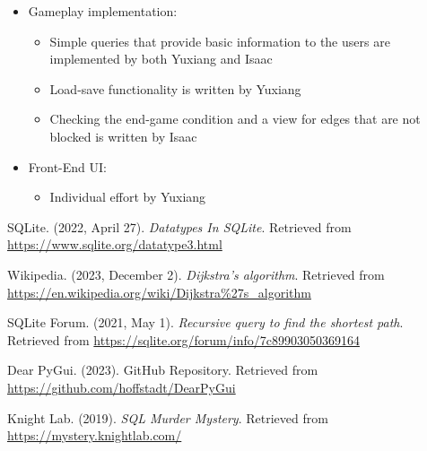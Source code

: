 \documentclass{article}
\begin{document}
\begin{itemize}
    \item Gameplay implementation:
    \begin{itemize}
        \item Simple queries that provide basic information to the users are implemented by both Yuxiang and Isaac
        \item Load-save functionality is written by Yuxiang
        \item Checking the end-game condition and a view for edges that are not blocked is written by Isaac
    \end{itemize}
    \item Front-End UI:
    \begin{itemize}
        \item Individual effort by Yuxiang
    \end{itemize}
\end{itemize}

\pagebreak

\begin{thebibliography}{9}
    SQLite. (2022, April 27). \textit{Datatypes In SQLite}. Retrieved from \url{https://www.sqlite.org/datatype3.html}

    Wikipedia. (2023, December 2). \textit{Dijkstra's algorithm}. Retrieved from \url{https://en.wikipedia.org/wiki/Dijkstra%27s_algorithm}
    
    SQLite Forum. (2021, May 1). \textit{Recursive query to find the shortest path}. Retrieved from \url{https://sqlite.org/forum/info/7c89903050369164}

    Dear PyGui. (2023). GitHub Repository. Retrieved from \url{https://github.com/hoffstadt/DearPyGui}
\end{thebibliography}

    \begin{thebibliography}{9}
    Knight Lab. (2019). \textit{SQL Murder Mystery}. Retrieved from \url{https://mystery.knightlab.com/}
\end{thebibliography}
\end{document}
